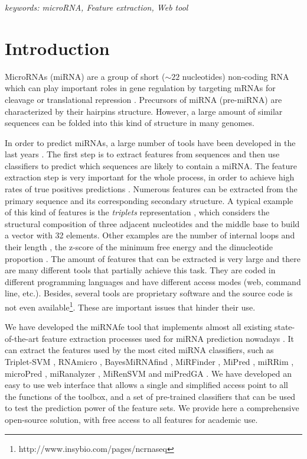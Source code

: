 \documentclass{article}
\begin{document}
\textit{keywords: microRNA, Feature extraction, Web tool}


\section{Introduction}
MicroRNAs (miRNA) are a group of short ($\sim22$ nucleotides) non-coding RNA which can play important roles in gene regulation by targeting mRNAs for cleavage 
or translational repression \citep{Lamers14}. Precursors of miRNA (pre-miRNA) are characterized by their hairpins structure. However, a large amount of similar 
sequences can be folded into this kind of structure in many genomes. 

In order to predict miRNAs, a large number of tools have been developed in the last years \citep{Kleftogiannis13}. The first step is to extract features from 
sequences and then use classifiers to predict which sequences are likely to contain a miRNA. The feature extraction step is very important for the whole 
process, in order to achieve high rates of true positives predictions \citep{Zhang10}.
Numerous features can be extracted from the primary sequence and its corresponding secondary structure. A typical example of this kind of features is the 
\textit{triplets} representation \citep{Xue05}, which considers the structural composition of three adjacent nucleotides and the middle base to build a vector 
with 32 elements. Other examples are the number of internal loops and their length \citep{Yousef06}, the z-score of the minimum free energy \citep{Hertel06} 
and the dinucleotide proportion \citep{Rukshan09}. The amount of features that can be extracted is very large and there are many different tools that partially 
achieve this task. They are coded in different programming languages and have different access modes (web, command line, etc.). Besides, several tools are 
proprietary software and the source code is not even available\footnote{http://www.insybio.com/pages/ncrnaseq}. These are important issues that hinder their 
use.

We have developed the miRNAfe tool that implements almost all existing state-of-the-art feature extraction processes used for miRNA prediction nowadays 
\citep{Li10}. It can extract the features used by the most cited miRNA classifiers, such as Triplet-SVM \citep{Xue05}, RNAmicro \citep{Hertel06}, 
BayesMiRNAfind \citep{Yousef06}, MiRFinder \citep{Huang07}, MiPred \citep{Jiang07}, miRRim \citep{Goro07}, microPred \citep{Rukshan09}, miRanalyzer 
\citep{Hackenberg09}, MiRenSVM \citep{Jiandong10} and miPredGA \citep{Xuan11}. We have developed an easy to use web interface that allows a single and 
simplified access point to all the functions of the toolbox, and a set of pre-trained classifiers that can be used to test the prediction power of the feature 
sets. We provide here a comprehensive open-source solution, with free access to all features for academic use.
\end{document}
